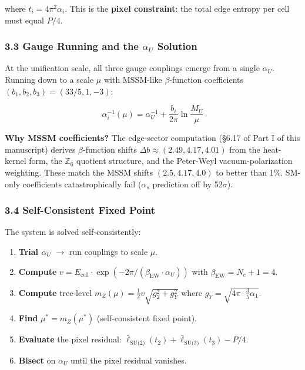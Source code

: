 where \(t_i = 4\pi^2 \alpha_i\). This is the \textbf{pixel constraint}: the total edge entropy per cell must equal \(P/4\).

\subsubsection{\texorpdfstring{3.3 Gauge Running and the \(\alpha_U\) Solution}{3.3 Gauge Running and the \textbackslash alpha\_U Solution}}\label{33-gauge-running-and-the-alpha_u-solution}

At the unification scale, all three gauge couplings emerge from a single \(\alpha_U\). Running down to a scale \(\mu\) with MSSM-like \(\beta\)-function coefficients \((b_1, b_2, b_3) = (33/5, 1, -3)\):

\[\alpha_i^{-1}(\mu) = \alpha_U^{-1} + \frac{b_i}{2\pi} \ln\frac{M_U}{\mu}\]

\textbf{Why MSSM coefficients?} The edge-sector computation (§6.17 of Part I of this manuscript) derives \(\beta\)-function shifts \(\Delta b \approx (2.49, 4.17, 4.01)\) from the heat-kernel form, the \(\mathbb{Z}_6\) quotient structure, and the Peter-Weyl vacuum-polarization weighting. These match the MSSM shifts \((2.5, 4.17, 4.0)\) to better than 1\%. SM-only coefficients catastrophically fail (\(\alpha_s\) prediction off by 52\(\sigma\)).

\subsubsection{3.4 Self-Consistent Fixed Point}\label{34-self-consistent-fixed-point}

The system is solved self-consistently:

\begin{enumerate}
\def\labelenumi{\arabic{enumi}.}
\tightlist
\item
  \textbf{Trial \(\alpha_U\)} \(\rightarrow\) run couplings to scale \(\mu\).
\item
  \textbf{Compute} \(v = E_{\text{cell}} \cdot \exp(-2\pi/(\beta_{\text{EW}} \cdot \alpha_U))\) with \(\beta_{\text{EW}} = N_c + 1 = 4\).
\item
  \textbf{Compute} tree-level \(m_Z(\mu) = \frac{1}{2} v \sqrt{g_2^2 + g_Y^2}\) where \(g_Y = \sqrt{4\pi \cdot \frac{3}{5}\alpha_1}\).
\item
  \textbf{Find} \(\mu^* = m_Z(\mu^*)\) (self-consistent fixed point).
\item
  \textbf{Evaluate} the pixel residual: \(\bar{\ell}_{\text{SU(2)}}(t_2) + \bar{\ell}_{\text{SU(3)}}(t_3) - P/4\).
\item
  \textbf{Bisect} on \(\alpha_U\) until the pixel residual vanishes.
\end{enumerate}

